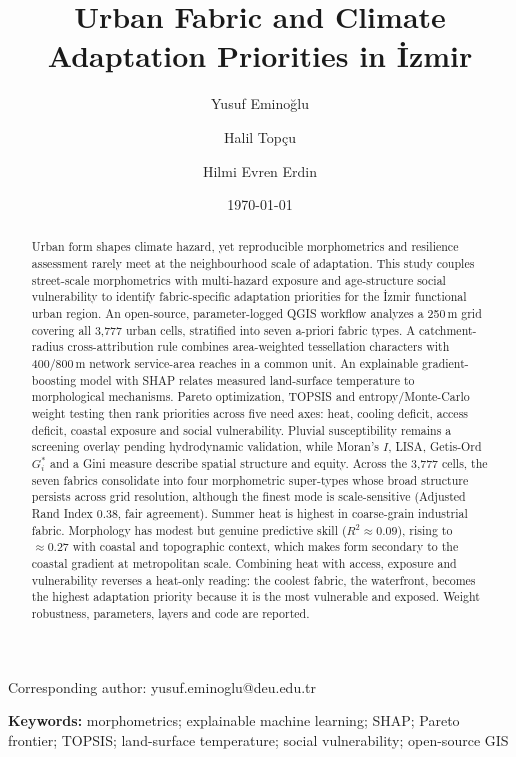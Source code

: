 \title{Urban Fabric and Climate Adaptation Priorities in \.{I}zmir}

\author[a]{Yusuf Emino\u{g}lu}
\author[b]{Halil Top\c{c}u}
\author[a]{Hilmi Evren Erdin}

\date{\today}

\maketitle

\begin{center}
\small Corresponding author: yusuf.eminoglu@deu.edu.tr
\end{center}

\begin{abstract}
Urban form shapes climate hazard, yet reproducible morphometrics and resilience
assessment rarely meet at the neighbourhood scale of adaptation. This study
couples street-scale morphometrics with multi-hazard
exposure and age-structure social vulnerability to identify fabric-specific
adaptation priorities for the \.{I}zmir functional urban region. An open-source,
parameter-logged QGIS workflow analyzes a 250\,m grid covering all 3{,}777 urban
cells, stratified into seven a-priori fabric types. A catchment-radius
cross-attribution rule combines area-weighted tessellation characters with
400/800\,m network service-area reaches in a common unit. An explainable
gradient-boosting model with SHAP relates measured land-surface temperature to
morphological mechanisms. Pareto optimization, TOPSIS and entropy/Monte-Carlo
weight testing then rank priorities across five need axes: heat, cooling deficit,
access deficit, coastal exposure and social vulnerability. Pluvial susceptibility
remains a screening overlay pending hydrodynamic validation, while Moran's $I$,
LISA, Getis-Ord $G_i^{*}$ and a Gini measure describe spatial structure and equity.
Across the 3{,}777 cells, the seven fabrics consolidate into four morphometric
super-types whose broad structure persists across grid resolution, although the
finest mode is scale-sensitive (Adjusted Rand Index 0.38, fair agreement). Summer
heat is highest in coarse-grain industrial fabric. Morphology has modest but
genuine predictive skill ($R^2\approx0.09$), rising to $\approx0.27$ with coastal
and topographic context, which makes form secondary to the coastal gradient at
metropolitan scale. Combining heat with access, exposure and vulnerability
reverses a heat-only reading: the coolest fabric, the waterfront, becomes the
highest adaptation priority because it is the most vulnerable and exposed.
Weight robustness, parameters, layers and code are reported.
\end{abstract}

\noindent\textbf{Keywords:} morphometrics; explainable machine learning; SHAP;
Pareto frontier; TOPSIS; land-surface temperature; social vulnerability;
open-source GIS
